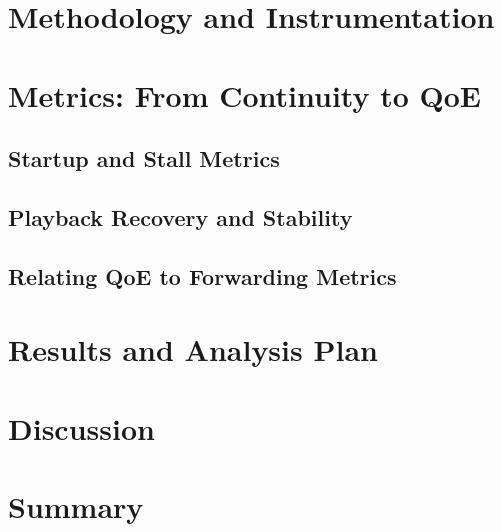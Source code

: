 
\section{Methodology and Instrumentation}


\section{Metrics: From Continuity to QoE}
\subsection{Startup and Stall Metrics}
\subsection{Playback Recovery and Stability}
\subsection{Relating QoE to Forwarding Metrics}


\section{Results and Analysis Plan}


\section{Discussion}


\section{Summary}
